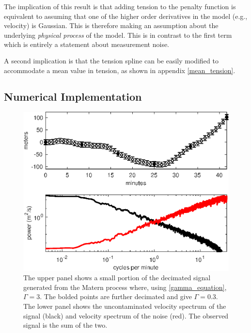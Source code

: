 \documentclass[10pt,journal]{IEEEtran}
\begin{document}
The implication of this result is that adding tension to the penalty function is equivalent to assuming that one of the higher order derivatives in the model (e.g., velocity) is Gaussian. This is therefore making an assumption about the underlying \emph{physical process} of the model. This is in contrast to the first term which is entirely a statement about measurement noise.

A second implication is that the tension spline can be easily modified to accommodate a mean value in tension, as shown in appendix \ref{mean_tension}. 

\subsection{Numerical Implementation}
\label{sec:numerical_implementation}

\begin{figure}[t]
  \centerline{\includegraphics[width=33pc,angle=0]{figures/synthetic_process_and_spectrum}}
  
  \caption{The upper panel shows a small portion of the decimated signal generated from the Matern process where, using \ref{gamma_equation}, $\Gamma = 3$. The bolded points are further decimated and give $\Gamma=0.3$. The lower panel shows the uncontaminated velocity spectrum of the signal (black) and velocity spectrum of the noise (red). The observed signal is the sum of the two. }
  \label{synthetic_process_and_spectrum}
\end{figure}
\end{document}

